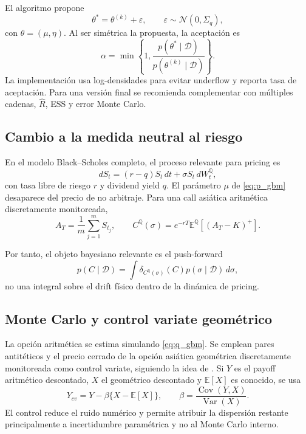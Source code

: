 \documentclass[12pt,letterpaper]{article}
\newcommand{\Qmeasure}{\mathbb{Q}}
\newcommand{\E}{\mathbb{E}}
\newcommand{\Var}{\operatorname{Var}}
\begin{document}
El algoritmo propone
\begin{equation}
 \theta^*=\theta^{(k)}+\varepsilon,
 \qquad
 \varepsilon\sim\mathcal N(0,\Sigma_q),
\end{equation}
con $\theta=(\mu,\eta)$. Al ser simétrica la propuesta, la aceptación es
\begin{equation}
 \alpha=\min\left\{1,
 \frac{p(\theta^*\mid\mathcal D)}{p(\theta^{(k)}\mid\mathcal D)}
 \right\}.
\end{equation}
La implementación usa log-densidades para evitar underflow y reporta tasa de aceptación. Para una versión final se recomienda complementar con múltiples cadenas, $\widehat R$, ESS y error Monte Carlo.

\subsection{Cambio a la medida neutral al riesgo}

En el modelo Black--Scholes completo, el proceso relevante para pricing es
\begin{equation}
 dS_t=(r-q)S_t\,dt+\sigma S_t\,dW_t^{\Qmeasure},
 \label{eq:q_gbm}
\end{equation}
con tasa libre de riesgo $r$ y dividend yield $q$. El parámetro $\mu$ de \eqref{eq:p_gbm} desaparece del precio de no arbitraje. Para una call asiática aritmética discretamente monitoreada,
\begin{equation}
 A_T=\frac1m\sum_{j=1}^{m}S_{t_j},
 \qquad
 C^{\Qmeasure}(\sigma)
 =e^{-rT}\E^{\Qmeasure}\left[(A_T-K)^+\right].
 \label{eq:asian_price}
\end{equation}

Por tanto, el objeto bayesiano relevante es el push-forward
\begin{equation}
 p(C\mid\mathcal D)
 =\int
 \delta_{C^{\Qmeasure}(\sigma)}(C)
 p(\sigma\mid\mathcal D)\,d\sigma,
 \label{eq:pushforward}
\end{equation}
no una integral sobre el drift físico dentro de la dinámica de pricing.

\subsection{Monte Carlo y control variate geométrico}

La opción aritmética se estima simulando \eqref{eq:q_gbm}. Se emplean pares antitéticos y el precio cerrado de la opción asiática geométrica discretamente monitoreada como control variate, siguiendo la idea de \citet{kemnavorst1990}. Si $Y$ es el payoff aritmético descontado, $X$ el geométrico descontado y $\E[X]$ es conocido, se usa
\begin{equation}
 Y_{cv}=Y-\beta\{X-\E[X]\},
 \qquad
 \beta=\frac{\operatorname{Cov}(Y,X)}{\Var(X)}.
\end{equation}
El control reduce el ruido numérico y permite atribuir la dispersión restante principalmente a incertidumbre paramétrica y no al Monte Carlo interno.
\end{document}
